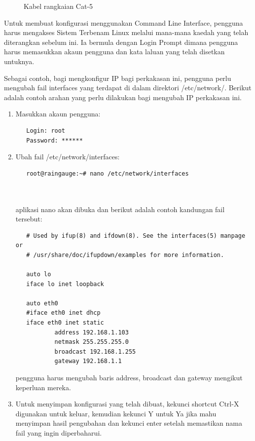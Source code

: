 \begin{figure}[!h]
\caption[Kabel rangkaian Cat-5]{Kabel rangkaian Cat-5}
\label{c2:f3}
\end{figure}

Untuk membuat konfigurasi menggunakan Command Line Interface, pengguna harus mengakses Sistem Terbenam Linux melalui mana-mana kaedah yang telah diterangkan sebelum ini. Ia bermula dengan Login Prompt dimana pengguna harus memasukkan akaun pengguna dan kata laluan yang telah disetkan untuknya.

Sebagai contoh, bagi mengkonfigur IP bagi perkakasan ini, pengguna perlu mengubah fail interfaces yang terdapat di dalam direktori /etc/network/. Berikut adalah contoh arahan yang perlu dilakukan bagi mengubah IP perkakasan ini.
\begin{enumerate}
\item Masukkan akaun pengguna:
{\footnotesize\renewcommand{\baselinestretch}{1.0}
\begin{verbatim}
   Login: root
   Password: ******

\end{verbatim}}

\item Ubah fail /etc/network/interfaces:
{\footnotesize\renewcommand{\baselinestretch}{1.0}
\begin{verbatim}
   root@raingauge:~# nano /etc/network/interfaces
   
   
\end{verbatim}}
   aplikasi nano akan dibuka dan berikut adalah contoh kandungan fail tersebut:
{\footnotesize\renewcommand{\baselinestretch}{1.0}
\begin{verbatim}   
   # Used by ifup(8) and ifdown(8). See the interfaces(5) manpage or 
   # /usr/share/doc/ifupdown/examples for more information.
   
   auto lo
   iface lo inet loopback
   
   auto eth0
   #iface eth0 inet dhcp
   iface eth0 inet static
           address 192.168.1.103
           netmask 255.255.255.0
           broadcast 192.168.1.255
           gateway 192.168.1.1
\end{verbatim}}

pengguna harus mengubah baris address, broadcast dan gateway mengikut keperluan mereka.
   
\item Untuk menyimpan konfigurasi yang telah dibuat, kekunci shortcut Ctrl-X digunakan untuk keluar, kemudian kekunci Y untuk Ya jika mahu menyimpan hasil pengubahan dan kekunci enter setelah memastikan nama fail yang ingin diperbaharui.
\end{enumerate}

